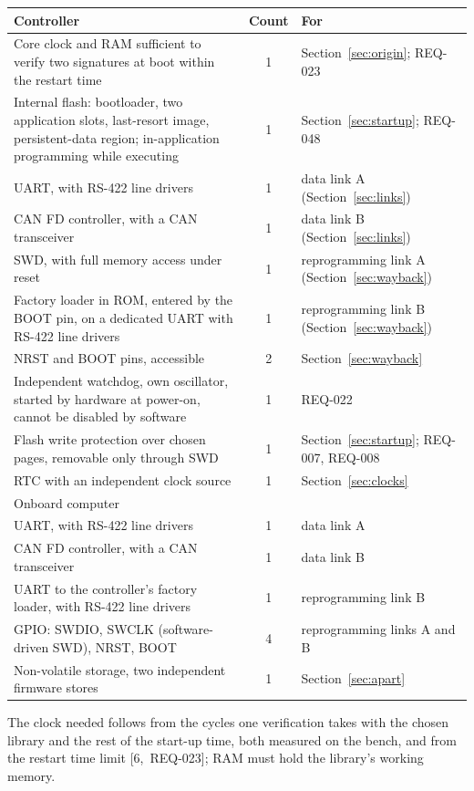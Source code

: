 \documentclass[11pt,a4paper]{article}
\begin{document}
\smallskip
{\small\renewcommand{\arraystretch}{1.25}\noindent\begin{tabularx}{\textwidth}{@{}>{\raggedright\arraybackslash}Xcl@{}}
\toprule
Controller & Count & For \\
\midrule
Core clock and RAM sufficient to verify two signatures at boot within the restart time & 1 & Section~\ref{sec:origin}; REQ-023 \\
Internal flash: bootloader, two application slots, last-resort image, persistent-data region; in-application programming while executing & 1 & Section~\ref{sec:startup}; REQ-048 \\
UART, with RS-422 line drivers & 1 & data link A (Section~\ref{sec:links}) \\
CAN FD controller, with a CAN transceiver & 1 & data link B (Section~\ref{sec:links}) \\
SWD, with full memory access under reset & 1 & reprogramming link A (Section~\ref{sec:wayback}) \\
Factory loader in ROM, entered by the BOOT pin, on a dedicated UART with RS-422 line drivers & 1 & reprogramming link B (Section~\ref{sec:wayback}) \\
NRST and BOOT pins, accessible & 2 & Section~\ref{sec:wayback} \\
Independent watchdog, own oscillator, started by hardware at power-on, cannot be disabled by software & 1 & REQ-022 \\
Flash write protection over chosen pages, removable only through SWD & 1 & Section~\ref{sec:startup}; REQ-007, REQ-008 \\
RTC with an independent clock source & 1 & Section~\ref{sec:clocks} \\
\midrule
Onboard computer & & \\
\midrule
UART, with RS-422 line drivers & 1 & data link A \\
CAN FD controller, with a CAN transceiver & 1 & data link B \\
UART to the controller's factory loader, with RS-422 line drivers & 1 & reprogramming link B \\
GPIO: SWDIO, SWCLK (software-driven SWD), NRST, BOOT & 4 & reprogramming links A and B \\
Non-volatile storage, two independent firmware stores & 1 & Section~\ref{sec:apart} \\
\bottomrule
\end{tabularx}}

\smallskip
\noindent The clock needed follows from the cycles one verification takes with
the chosen library and the rest of the start-up time, both measured on the
bench, and from the restart time limit [6,~REQ-023]; RAM must hold the
library's working memory.
\end{document}
